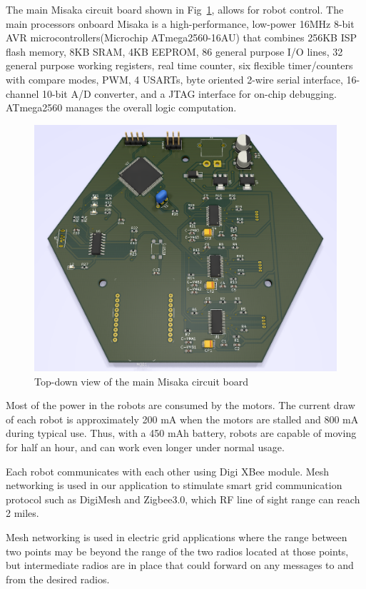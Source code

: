 \documentclass[conference]{IEEEtran}
\begin{document}
The main Misaka circuit board shown in Fig~\ref{fig:PCB}, allows for robot control. The main processors onboard Misaka is a high-performance, low-power 16MHz 8-bit AVR microcontrollers(Microchip ATmega2560-16AU) that combines 256KB ISP flash memory, 8KB SRAM, 4KB EEPROM, 86 general purpose I/O lines, 32 general purpose working registers, real time counter, six flexible timer/counters with compare modes, PWM, 4 USARTs, byte oriented 2-wire serial interface, 16-channel 10-bit A/D converter, and a JTAG interface for on-chip debugging. ATmega2560 manages the overall logic computation.

\begin{figure}[htbp]
    \centering
    \includegraphics[width=0.6\columnwidth]{PCB.png}
    \caption{Top-down view of the main Misaka circuit board}
    \label{fig:PCB}
\end{figure}

Most of the power in the robots are consumed by the motors. The current draw of each robot is approximately 200 mA when the motors are stalled and 800 mA during typical use. Thus, with a 450 mAh battery, robots are capable of moving for half an hour, and can work even longer under normal usage.

Each robot communicates with each other using Digi XBee module. Mesh networking is used in our application to stimulate smart grid communication protocol such as DigiMesh and Zigbee3.0, which RF line of sight range can reach 2 miles.

Mesh networking is used in electric grid applications where the range between two points may be beyond the range of the two radios located at those points, but intermediate radios are in place that could forward on any messages to and from the desired radios.

\end{document}
